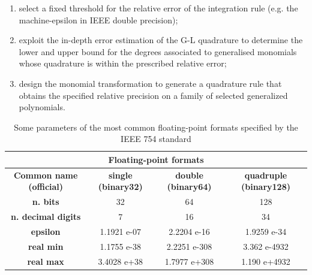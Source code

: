 \documentclass[a4paper, twosided]{book}
\begin{document}
\begin{enumerate}
    \item select a fixed threshold for the relative error of the integration rule (e.g. the machine-epsilon in IEEE double precision);
    \item exploit the in-depth error estimation of the G-L quadrature to determine the lower and upper bound for the degrees associated to generalised monomials whose quadrature is within the prescribed relative error;
    \item design the monomial transformation to generate a quadrature rule that obtains the specified relative precision on a family of selected generalized polynomials.
\end{enumerate}

\begin{table}[H]
\centering
\begin{tabular}{|c||c|c|c|}
\hline
\multicolumn{4}{|c|}{\textbf{Floating-point formats}} \\
\hline
\textbf{Common name (official)} & \textbf{single (binary32)} & \textbf{double (binary64)} & \textbf{quadruple (binary128)} \\
\hline
\textbf{n. bits}                & 32          & 64           & 128          \\
\textbf{n. decimal digits}      & 7           & 16           & 34           \\
\textbf{epsilon}                & 1.1921 e-07 & 2.2204 e-16  & 1.9259 e-34  \\
\textbf{real min}                    & 1.1755 e-38 & 2.2251 e-308 & 3.362 e-4932 \\
\textbf{real max}                    & 3.4028 e+38 & 1.7977 e+308 & 1.190 e+4932 \\
\hline
\end{tabular}
  \caption{Some parameters of the most common floating-point formats specified by the IEEE 754 standard \cite{IEEE754}}
  \label{table1.1}
\end{table}
\end{document}
